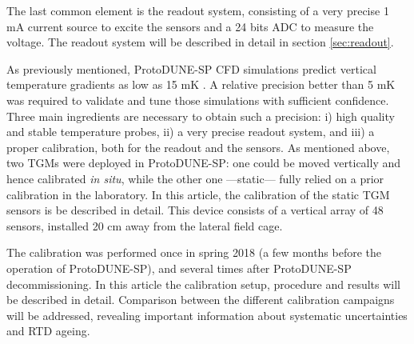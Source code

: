 The last common element is the readout system, consisting of a very precise 1 mA current source to excite the sensors and a 24 bits ADC to measure the voltage. The readout system will be described in detail in section \ref{sec:readout}. 

As previously mentioned, ProtoDUNE-SP CFD simulations predict vertical temperature gradients as low as 15 mK \cite{pdsp_tdr}. A relative precision better than 5 mK was required to validate and tune those simulations with sufficient confidence. Three main ingredients are necessary to obtain such a precision: i) high quality and stable temperature probes, ii) a very precise readout system, and iii) a proper calibration, both for the readout and the sensors. As mentioned above, two TGMs were deployed in ProtoDUNE-SP: one could be moved vertically and hence calibrated \textit{in situ}, while the other one ---static--- fully relied on a prior calibration in the laboratory. In this article, the calibration of the static TGM \cite{tfm} sensors is be described in detail. This device consists of a vertical array of 48 sensors, installed 20 cm away from the lateral field cage. 

The calibration was performed once in spring 2018  (a few months before the operation of ProtoDUNE-SP), and several times after ProtoDUNE-SP decommissioning. In this article the calibration setup, procedure and results will be described in detail. Comparison between the different calibration campaigns will be addressed, revealing important information about systematic uncertainties and RTD ageing.